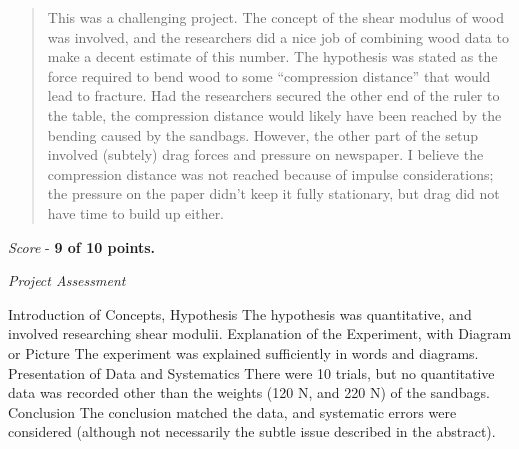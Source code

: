 \documentclass[10pt]{article}
\begin{document}
\maketitle

\begin{abstract}
This was a challenging project.  The concept of the shear modulus of wood was involved, and the researchers did a nice job of combining wood data to make a decent estimate of this number.  The hypothesis was stated as the force required to bend wood to some ``compression distance'' that would lead to fracture.  Had the researchers secured the other end of the ruler to the table, the compression distance would likely have been reached by the bending caused by the sandbags.  However, the other part of the setup involved (subtely) drag forces and pressure on newspaper.  I believe the compression distance was not reached because of impulse considerations; the pressure on the paper didn't keep it fully stationary, but drag did not have time to build up either.
\end{abstract}

\textit{Score} - \textbf{9 of 10 points.}

\textit{Project Assessment}
\begin{outline}[enumerate]
\1 Introduction of Concepts, Hypothesis
\2 The hypothesis was quantitative, and involved researching shear modulii.
\1 Explanation of the Experiment, with Diagram or Picture
\2 The experiment was explained sufficiently in words and diagrams.
\1 Presentation of Data and Systematics
\2 There were 10 trials, but no quantitative data was recorded other than the weights (120 N, and 220 N) of the sandbags.
\1 Conclusion
\2 The conclusion matched the data, and systematic errors were considered (although not necessarily the subtle issue described in the abstract).
\end{outline}
\end{document}
